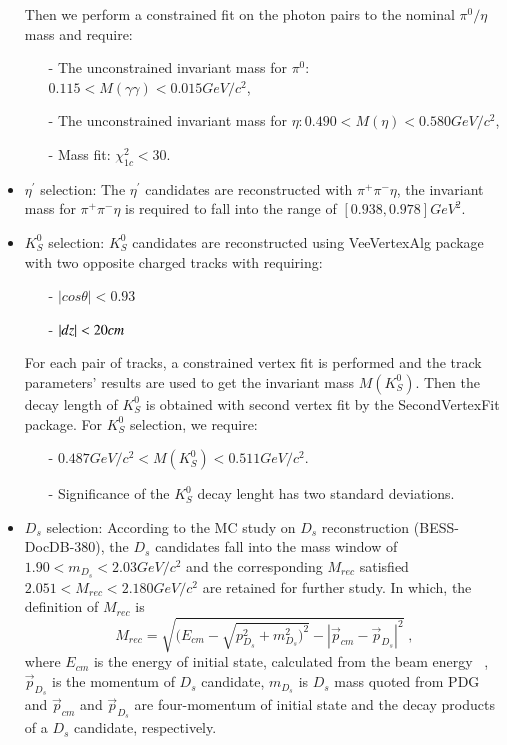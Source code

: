 \begin{itemize}
		Then we perform a constrained fit on the photon pairs to the nominal $\pi^{0}/\eta$ mass and require:
		\begin{itemize}
			\item[-] The unconstrained invariant mass for $\pi^{0}$: $0.115 < M(\gamma\gamma) < 0.015 GeV/c^{2}$,
			\item[-] The unconstrained invariant mass for $\eta: 0.490 < M(\eta) < 0.580 GeV/c^{2}$,
			\item[-] Mass fit: $\chi_{1c}^{2} < 30$.
		\end{itemize}
	\item $\eta^{'}$ selection: The $\eta^{'}$ candidates are reconstructed with $\pi^{+}\pi^{-}\eta$, the invariant mass for $\pi^{+}\pi^{-}\eta$ is required to fall into the range of $[0.938, 0.978] GeV^{2}$.
	\item $K_{S}^{0}$ selection: $K_{S}^{0}$ candidates are reconstructed using VeeVertexAlg package with two opposite charged tracks with requiring:
		\begin{itemize}
			\item[-] $|cos\theta| < 0.93$
			\item[-] $|dz| < 20 \emph{cm} $
		\end{itemize}

		For each pair of tracks, a constrained vertex fit is performed and the track parameters' results are used to get the invariant mass $M(K_{S}^{0})$. Then the decay length of $K_{S}^{0}$ is obtained with second vertex 
		fit by the SecondVertexFit package. For $K_{S}^{0}$ selection, we require:
		\begin{itemize}
			\item[-] $0.487GeV/c^{2} < M(K_S^{0}) < 0.511 GeV/c^{2}$.
			\item[-] Significance of the $K_{S}^{0}$ decay lenght has two standard deviations.
		\end{itemize}

	\item $D_{s}$ selection: According to the MC study on $D_{s}$ reconstruction (BESS\uppercase\expandafter{}-DocDB-380), the $D_{s}$ candidates fall into the mass window of $1.90 < m_{D_{s}} < 2.03 GeV/c^{2}$ and 
		the corresponding $M_{rec}$ satisfied $2.051 < M_{rec} < 2.180 GeV/c^{2}$ are retained for further study. In which, the definition of $M_{rec}$ is
		\begin{equation}
			M_{rec} = \sqrt{(E_{cm} - \sqrt{p_{D_{s}}^{2} + m_{D_{s}}^{2})^{2}} - |\vec p_{cm} - \vec p_{D_{s}} | ^{2}} \; , \label{con:inventoryflow}
		\end{equation}
		where $E_{cm}$ is the energy of initial state, calculated from the beam energy ~\cite{DocDB 580-v1}, $\vec p_{D_{s}}$ is the momentum of $D_{s}$ candidate, $m_{D_{s}}$ is $D_{s}$ mass quoted from PDG ~\cite{PDG} and $\vec p_{cm}$ and $\vec p_{D_{s}}$ are four-momentum of initial state and the decay products of a $D_{s}$ candidate, respectively.
\end{itemize}

